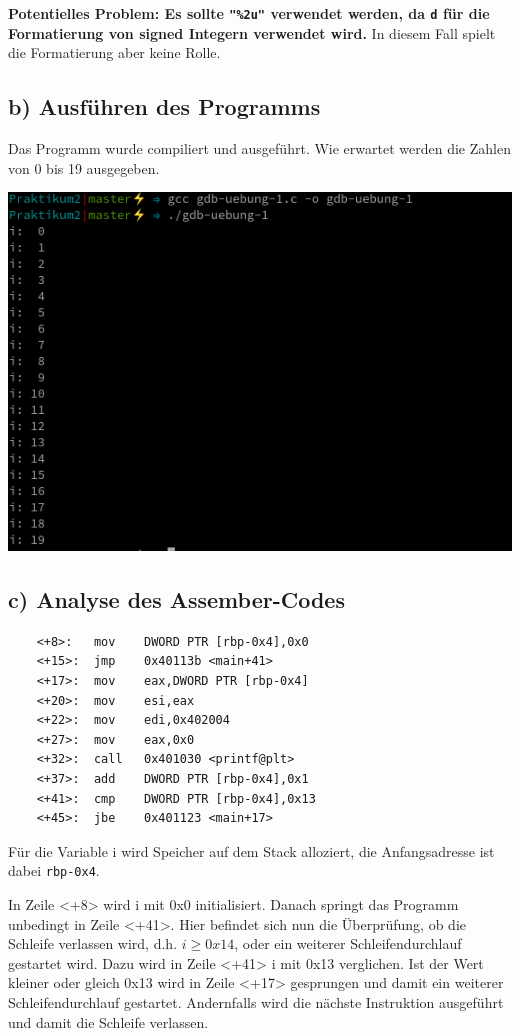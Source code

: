 \documentclass[12pt]{article}
\begin{document}
\textbf{Potentielles Problem: Es sollte \texttt{"\%2u"} verwendet werden, da \texttt{d} für die Formatierung von signed Integern verwendet wird.} In diesem Fall spielt die Formatierung aber keine Rolle.

\subsection{b) Ausführen des Programms}
Das Programm wurde compiliert und ausgeführt. Wie erwartet werden die Zahlen von 0 bis 19 ausgegeben.

\begin{center}
   \includegraphics[scale=0.9]{Pictures/aufgabe1b.png}
\end{center}


\subsection{c) Analyse des Assember-Codes}
\begin{lstlisting}
	<+8>:	mov    DWORD PTR [rbp-0x4],0x0
    <+15>:	jmp    0x40113b <main+41>
    <+17>:	mov    eax,DWORD PTR [rbp-0x4]
    <+20>:	mov    esi,eax
    <+22>:	mov    edi,0x402004
    <+27>:	mov    eax,0x0
    <+32>:	call   0x401030 <printf@plt>
    <+37>:	add    DWORD PTR [rbp-0x4],0x1
    <+41>:	cmp    DWORD PTR [rbp-0x4],0x13
    <+45>:	jbe    0x401123 <main+17>
\end{lstlisting}

Für die Variable i wird Speicher auf dem Stack alloziert, die Anfangsadresse ist dabei \texttt{rbp-0x4}.

In Zeile <+8> wird i mit 0x0 initialisiert. Danach springt das Programm unbedingt in Zeile <+41>. Hier befindet sich nun die Überprüfung, ob die Schleife verlassen wird, d.h. $ i \ge 0x14 $, oder ein weiterer Schleifendurchlauf gestartet wird. Dazu wird in Zeile <+41> i mit 0x13 verglichen. Ist der Wert kleiner oder gleich 0x13 wird in Zeile <+17> gesprungen und damit ein weiterer Schleifendurchlauf gestartet. Andernfalls wird die nächste Instruktion ausgeführt und damit die Schleife verlassen.
\end{document}
